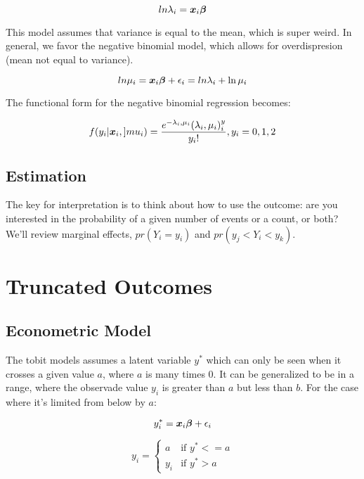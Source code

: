 \documentclass[12 pt]{article}
\begin{document}
\begin{equation}
  \label{eq:2}
  ln \lambda_i=\boldsymbol{x}_i\boldsymbol{\beta}
\end{equation}

This model assumes that variance is equal to the mean, which is super weird. In general, we favor the negative binomial model, which allows for overdispresion (mean not equal to variance). 

\begin{equation}
  \label{eq:3}
  ln \mu_i=\boldsymbol{x}_i\boldsymbol{\beta} +\epsilon_i= ln \lambda_i +\ln \mu_i
\end{equation}

The functional form for the negative binomial regression becomes:

\begin{equation}
  \label{eq:4}
  f(y_i|\boldsymbol{x}_i, ]mu_i)=\frac{e^{-\lambda_i,\mu_i}(\lambda_i,\mu_i)^y_i}{y_i!}, y_i=0,1,2
\end{equation}


\subsection{Estimation}
The key for interpretation is to think about how to use the outcome: are you interested in the probability of a given number of events or a count, or both? We'll review marginal effects, $pr(Y_i=y_i)$ and $pr(y_j<Y_i<y_k)$.



\section{Truncated Outcomes}

\subsection{Econometric Model}

The tobit models assumes a latent variable $y^*$ which can only be seen when it crosses a given value $a$, where $a$ is many times 0. It can be generalized to be in a range, where the observade value $y_i$ is greater than $a$ but less than $b$. For the case where it's limited from below by $a$:

\begin{equation}
  \label{eq:5}
 y^*_i=\boldsymbol{x}_i\boldsymbol{\beta} +\epsilon_i
\end{equation}

\begin{equation}
  \label{eq:6}
y_i= \begin{cases}a & \mbox{if } y^*<=a \\
y_i & \mbox{if } y^*>a \end{cases}
\end{equation}
\end{document}
